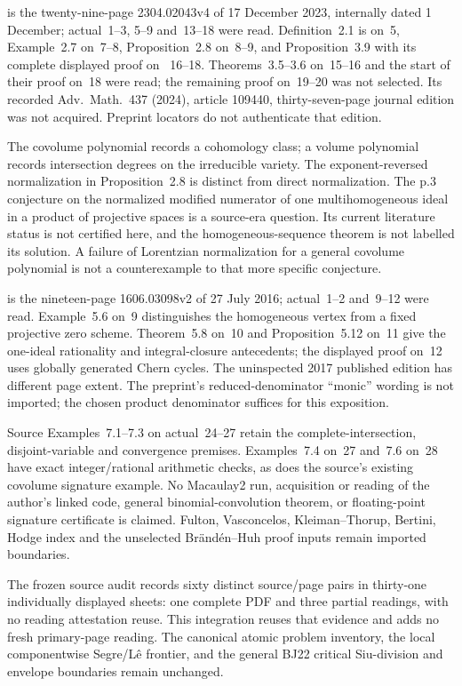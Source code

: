 \cite{Aluffi23CovolumeV4} is the twenty-nine-page
2304.02043v4 of 17 December 2023, internally dated 1 December;
actual~1--3, 5--9 and~13--18 were read. Definition~2.1 is
on~5, Example~2.7 on~7--8, Proposition~2.8 on~8--9,
and Proposition~3.9 with its complete displayed proof on
~16--18. Theorems~3.5--3.6 on~15--16 and the start of their
proof on~18 were read; the remaining proof on~19--20 was
not selected. Its recorded Adv.~Math.~437 (2024), article
109440, thirty-seven-page journal edition was not acquired.
Preprint locators do not authenticate that edition.

The covolume polynomial records a cohomology class; a volume
polynomial records intersection degrees on the irreducible
variety. The exponent-reversed normalization in Proposition~2.8
is distinct from direct normalization. The p.3 conjecture
on the normalized modified numerator of one multihomogeneous
ideal in a product of projective spaces is a source-era
question. Its current literature status is not certified
here, and the homogeneous-sequence theorem is not labelled
its solution. A failure of Lorentzian normalization for a
general covolume polynomial is not a counterexample to
that more specific conjecture.

\cite{Aluffi16SegreZetaV2} is the nineteen-page
1606.03098v2 of 27 July 2016; actual~1--2 and~9--12 were
read. Example~5.6 on~9 distinguishes the homogeneous vertex
from a fixed projective zero scheme. Theorem~5.8 on~10 and
Proposition~5.12 on~11 give the one-ideal rationality and
integral-closure antecedents; the displayed proof on~12 uses
globally generated Chern cycles. The uninspected 2017
published edition has different page extent. The preprint's
reduced-denominator ``monic'' wording is not imported;
the chosen product denominator suffices for this exposition.

Source Examples~7.1--7.3 on actual~24--27 retain the
complete-intersection, disjoint-variable and convergence
premises. Examples~7.4 on~27 and~7.6 on~28 have exact
integer/rational arithmetic checks, as does the source's
existing covolume signature example. No Macaulay2
run, acquisition or reading of the author's linked code,
general binomial-convolution theorem, or floating-point
signature certificate is claimed. Fulton, Vasconcelos,
Kleiman--Thorup, Bertini, Hodge index and the unselected
Br\"and\'en--Huh proof inputs remain imported boundaries.

The frozen source audit records sixty distinct source/page
pairs in thirty-one individually displayed sheets: one
complete PDF and three partial readings, with no reading
attestation reuse. This integration reuses that evidence
and adds no fresh primary-page reading. The canonical atomic
problem inventory, the local componentwise Segre/L\^e frontier,
and the general BJ22 critical Siu-division and envelope
boundaries remain unchanged.

